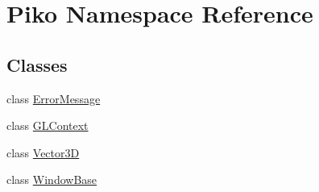 \hypertarget{namespace_piko}{\section{Piko Namespace Reference}
\label{dc/d83/namespace_piko}
}
\subsection*{Classes}
\begin{DoxyCompactItemize}
\item 
class \hyperlink{class_piko_1_1_error_message}{Error\-Message}
\item 
class \hyperlink{class_piko_1_1_g_l_context}{G\-L\-Context}
\item 
class \hyperlink{class_piko_1_1_vector3_d}{Vector3\-D}
\item 
class \hyperlink{class_piko_1_1_window_base}{Window\-Base}
\end{DoxyCompactItemize}
